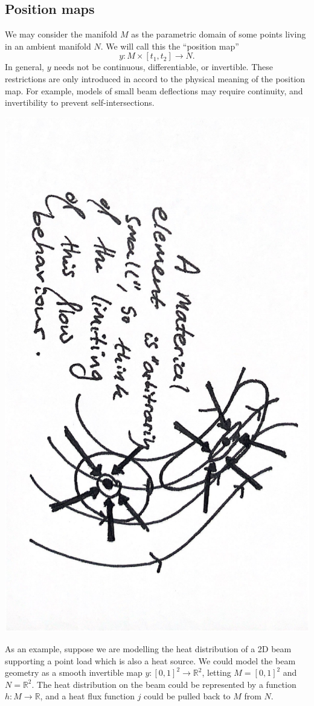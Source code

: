 \subsection{Position maps}
We may consider the manifold $M$ as the parametric domain of some points living in an ambient manifold $N$.
We will call this the ``position map''
    $$y:M\times [t_1, t_2] \rightarrow N.$$
In general, $y$ needs not be continuous, differentiable, or invertible.
These restrictions are only introduced in accord to the physical meaning of the position map. For example, models of small beam deflections
may require continuity, and invertibility to prevent self-intersections.

\begin{center}
\includegraphics[angle=90,page=8,width=0.5\linewidth]{figures/2.pdf}
\end{center}


As an example, suppose we are modelling the heat distribution of a 2D beam supporting a point load which is also a heat source.
We could model the beam geometry as a smooth invertible map $y: [0,1]^2\rightarrow \mathbb{R}^2$,
letting $M = [0,1]^2$ and $N = \mathbb{R}^2$. The heat distribution on the beam could be represented
by a function $h : M \rightarrow \mathbb{R}$, and a heat flux function $j$ could be pulled back to $M$ from $N$.

